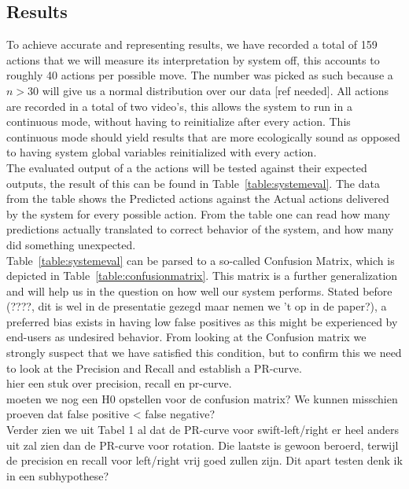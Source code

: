 \documentclass[11pt,a4paper]{article}
\begin{document}
\subsection{Results}
To achieve accurate and representing results, we have recorded a total of 159 actions that we will measure its interpretation by system off, this accounts to roughly 40 actions per possible move.  The number was picked as such because a $n > 30$ will give us a normal distribution over our data [ref needed]. All actions are recorded in a total of two video's, this allows the system to run in a continuous mode, without having to reinitialize after every action. This continuous mode should yield results that are more ecologically sound as opposed to having system global variables reinitialized with every action.
\\ The evaluated output of a the actions will be tested against their expected outputs, the result of this can be found in Table~\ref{table:systemeval}. The data from the table shows the Predicted actions against the Actual actions delivered by the system for every possible action. From the table one can read how many predictions actually translated to correct behavior of the system, and how many did something unexpected.
\\ Table~\ref{table:systemeval} can be parsed to a so-called Confusion Matrix, which is depicted in Table~\ref{table:confusionmatrix}. This matrix is a further generalization and will help us in the question on how well our system performs. Stated before (????, dit is wel in de presentatie gezegd maar nemen we 't op in de paper?), a preferred bias exists in having low false positives as this might be experienced by end-users as undesired behavior. From looking at the Confusion matrix we strongly suspect that we have satisfied this condition, but to confirm this we need to look at the Precision and Recall and establish a PR-curve.
\\ hier een stuk over precision, recall en pr-curve.
\\ moeten we nog een H0 opstellen voor de confusion matrix? We kunnen misschien proeven dat false positive < false negative?
\\ Verder zien we uit Tabel 1 al dat de PR-curve voor swift-left/right er heel anders uit zal zien dan de PR-curve voor rotation. Die laatste is gewoon beroerd, terwijl de precision en recall voor left/right vrij goed zullen zijn. Dit apart testen denk ik in een subhypothese?
\end{document}
